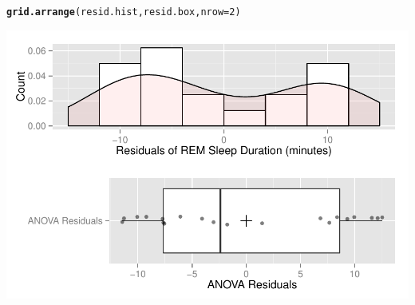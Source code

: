 \documentclass{article}\usepackage[]{graphicx}\usepackage[]{color}
\makeatletter
\def\maxwidth{ %
  \ifdim\Gin@nat@width>\linewidth
    \linewidth
  \else
    \Gin@nat@width
  \fi
}
\newcommand{\hlnum}[1]{\textcolor[rgb]{0.686,0.059,0.569}{#1}}%
\newcommand{\hlstd}[1]{\textcolor[rgb]{0.345,0.345,0.345}{#1}}%
\newcommand{\hlkwc}[1]{\textcolor[rgb]{0.333,0.667,0.333}{#1}}%
\newcommand{\hlkwd}[1]{\textcolor[rgb]{0.737,0.353,0.396}{\textbf{#1}}}%
\newenvironment{kframe}{%
 \def\at@end@of@kframe{}%
 \ifinner\ifhmode%
  \def\at@end@of@kframe{\end{minipage}}%
  \begin{minipage}{\columnwidth}%
 \fi\fi%
 \def\FrameCommand##1{\hskip\@totalleftmargin \hskip-\fboxsep
 \colorbox{shadecolor}{##1}\hskip-\fboxsep
     \hskip-\linewidth \hskip-\@totalleftmargin \hskip\columnwidth}%
 \MakeFramed {\advance\hsize-\width
   \@totalleftmargin\z@ \linewidth\hsize
   \@setminipage}}%
 {\par\unskip\endMakeFramed%
 \at@end@of@kframe}
\newenvironment{knitrout}{}{} %
\makeatother
\begin{document}
\begin{knitrout}
\begin{kframe}
\begin{alltt}
\hlkwd{grid.arrange}\hlstd{(resid.hist, resid.box,} \hlkwc{nrow} \hlstd{=} \hlnum{2}\hlstd{)}
\end{alltt}
\end{kframe}

{\centering \includegraphics[width=\maxwidth]{figure/h_plot-1} 

}



\end{knitrout}
\end{document}
